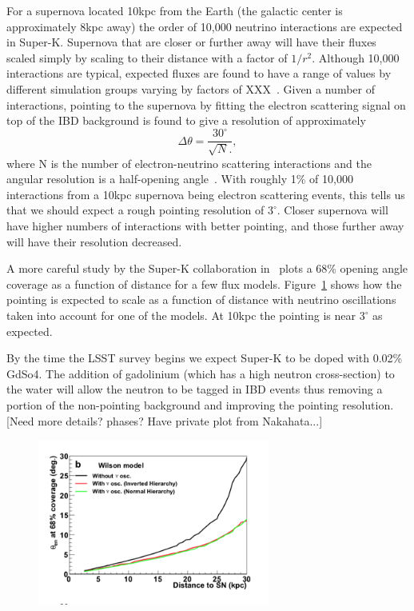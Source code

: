 \documentclass[11pt]{article}
\newcommand{\superk}  {Super\nobreakdash-K\xspace}
\begin{document}
For a supernova located 10kpc from the Earth (the galactic center is
approximately 8kpc away) the order of 10,000 neutrino interactions are
expected in \superk.  Supernova that are closer or further away will
have their fluxes scaled simply by scaling to their distance with a
factor of $1/r^2$.  Although 10,000 interactions are typical, expected
fluxes are found to have a range of values by different simulation
groups varying by factors of XXX~\cite{model_references}.  Given a
number of interactions, pointing to the supernova by fitting the
electron scattering signal on top of the IBD background is found to
give a resolution of approximately
%
$$ \Delta \theta = \frac{30^\circ}{\sqrt{N}.}, $$
%
where N is the number of electron-neutrino scattering interactions and
the angular resolution is a half-opening
angle~\cite{2012ARNPS..62...81S}.  With roughly 1\% of 10,000
interactions from a 10kpc supernova being electron scattering events,
this tells us that we should expect a rough pointing resolution of
$3^\circ$.  Closer supernova will have higher numbers of interactions
with better pointing, and those further away will have their
resolution decreased.

A more careful study by the \superk collaboration
in~\cite{2016APh....81...39A} plots a 68\% opening angle coverage as a
function of distance for a few flux
models. Figure~\ref{fig:SK-realtime-pointing-resolution} shows how the
pointing is expected to scale as a function of distance with neutrino
oscillations taken into account for one of the models. At 10kpc the
pointing is near $3^\circ$ as expected.


By the time the LSST survey begins we expect \superk to be doped with
0.02\% GdSo4.  The addition of gadolinium (which has a high neutron
cross-section) to the water will allow the neutron to be tagged in IBD
events thus removing a portion of the non-pointing background and
improving the pointing resolution. [Need more details? phases? Have
private plot from Nakahata...]

\begin{figure}
  \begin{center}
    \includegraphics[width=3.0in]{SK-realtime-pointing-resolution}
    \caption{}
    \label{fig:SK-realtime-pointing-resolution}
  \end{center}
\end{figure}
\end{document}
